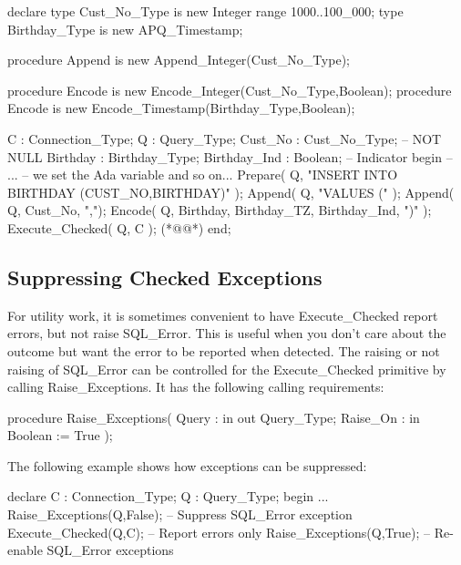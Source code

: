 \documentclass[english,letterpaper]{book}
\begin{document}
\begin{NumberedExample}[label=Ex:Execute_Checked,caption=Executing Queries using Execute\_Checked]
declare
   type Cust_No_Type is new Integer range 1000..100_000;
   type Birthday_Type is new APQ_Timestamp;

   procedure Append is new Append_Integer(Cust_No_Type);

   procedure Encode is new Encode_Integer(Cust_No_Type,Boolean);
   procedure Encode is new Encode_Timestamp(Birthday_Type,Boolean);

   C            : Connection_Type;
   Q            : Query_Type;
   Cust_No      : Cust_No_Type;     -- NOT NULL
   Birthday     : Birthday_Type;
   Birthday_Ind : Boolean;          -- Indicator
begin
   -- ...
   -- we set the Ada variable and so on...
   Prepare( Q, "INSERT INTO BIRTHDAY (CUST_NO,BIRTHDAY)" );
   Append( Q, "VALUES (" );
   Append( Q, Cust_No, ",");
   Encode( Q, Birthday, Birthday_TZ, Birthday_Ind, ")" );
   Execute_Checked( Q, C ); (*@\label{Ex:Execute_Checked:Execute_Checked}@*)
end;
\end{NumberedExample}


\subsection{Suppressing Checked Exceptions}

For utility work, it is sometimes convenient to have Execute\_Checked
report errors, but not raise SQL\_Error. This is useful when you don't
care about the outcome but want the error to be reported when detected.
The raising or not raising of SQL\_Error can be controlled for the
Execute\_Checked primitive by calling
Raise\_Exceptions. It has the following calling
requirements:

\begin{Code}
procedure Raise_Exceptions(
   Query :    in out Query_Type;
   Raise_On : in     Boolean := True
);
\end{Code}

The following example shows how exceptions can be suppressed:

\begin{Example}
declare
   C : Connection_Type;
   Q : Query_Type;
begin
   ...
   Raise_Exceptions(Q,False); -- Suppress SQL_Error exception
   Execute_Checked(Q,C);      -- Report errors only
   Raise_Exceptions(Q,True);  -- Re-enable SQL_Error exceptions
\end{Example}
\end{document}
